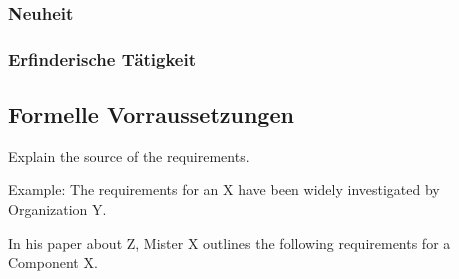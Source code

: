 \subsubsection{Neuheit}

\subsubsection{Erfinderische Tätigkeit}


\subsection{Formelle Vorraussetzungen\label{sec:forvor}}
Explain the source of the requirements. 

Example: The requirements for an X have been widely investigated by Organization Y. 

In his paper about Z, Mister X outlines the following requirements for a Component X.

